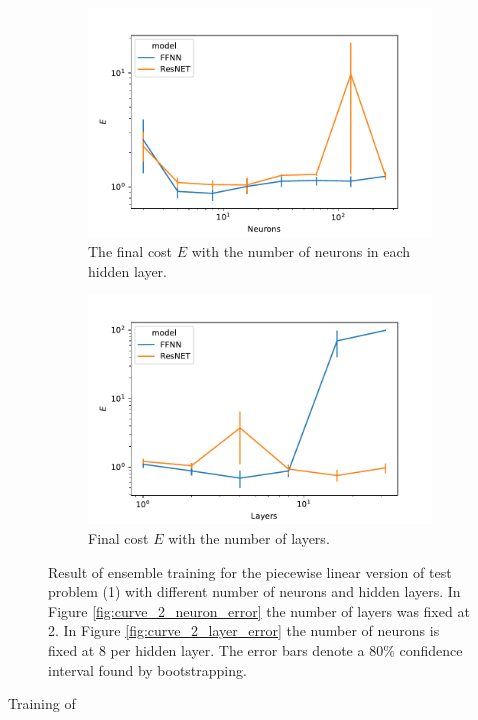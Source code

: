 \begin{figure}[t]\label{fig:curve_1_pl_eks}
    \begin{subfigure}[t]{0.5\textwidth}
        \centering
        \includegraphics[width=\linewidth]{figures/curve_1_pl/exp_2/neurons_error.pdf}
        \caption{The final cost \(E\) with the number of neurons in each hidden layer.}
        \label{fig:curve_1_pl_neuron_error}
    \end{subfigure}
    \begin{subfigure}[t]{0.5\textwidth}
        \centering
        \includegraphics[width=\linewidth]{figures/curve_1_pl/exp_2/layer_error.pdf}
        \caption{Final cost \(E\) with the number of layers.}
        \label{fig:curve_1_pl_layer_error}
    \end{subfigure}
    \caption{Result of ensemble training for the piecewise linear version of test problem (1) with different number of neurons and hidden layers. In Figure \ref{fig:curve_2_neuron_error} the number of layers was fixed at 2. In Figure \ref{fig:curve_2_layer_error} the number of neurons is fixed at 8 per hidden layer. The error bars denote a 80\% confidence interval found by bootstrapping.}
\end{figure}

Training of